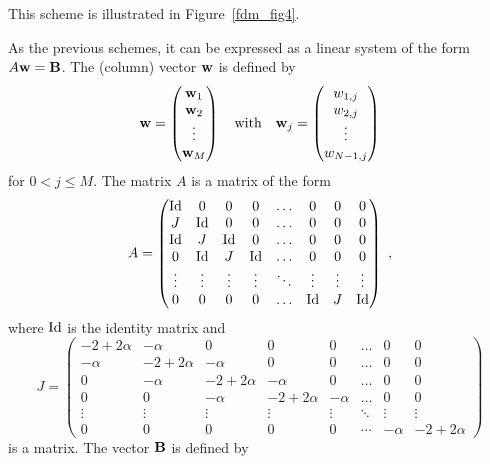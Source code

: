 
This scheme is illustrated in Figure~\ref{fdm_fig4}.

As the previous schemes, it can be expressed as a linear system of the
form $A\mathbf{w} = \mathbf{B}$.  The (column) vector $\mathbf{w}$ is defined by
\[
\mathbf{w} = \begin{pmatrix}
\mathbf{w}_1 \\ \mathbf{w}_2 \\ \vdots \\ \mathbf{w}_M
\end{pmatrix}
\quad \text{with} \quad
\mathbf{w}_j =
\begin{pmatrix} w_{1,j} \\ w_{2,j} \\ \vdots \\ w_{N-1,j} \end{pmatrix}
\]
for $0 < j \leq M$.
The matrix $A$ is a  matrix of the form
\[
A = \begin{pmatrix}
\operatorname{Id} & 0 & 0 & 0 & \ldots & 0 & 0 & 0 \\
J & \operatorname{Id} & 0 & 0 & \ldots & 0 & 0 & 0 \\
\operatorname{Id} & J & \operatorname{Id} & 0 & \ldots & 0 & 0 & 0 \\
0 & \operatorname{Id} & J & \operatorname{Id} & \ldots & 0 & 0 & 0 \\
\vdots & \vdots & \vdots & \vdots & \ddots & \vdots & \vdots & \vdots \\
0 & 0 & 0 & 0 & \ldots & \operatorname{Id} & J & \operatorname{Id}
\end{pmatrix} \ ,
\]
where $\operatorname{Id}$ is the  identity matrix and
\[
J = \begin{pmatrix}
-2+2\alpha & -\alpha & 0 & 0 & 0 & \ldots & 0 & 0 \\
-\alpha & -2+2\alpha & -\alpha & 0 & 0 & \ldots & 0 & 0  \\
0 & -\alpha & -2+2\alpha & -\alpha & 0 & \ldots & 0 & 0 \\
0 & 0 & -\alpha & -2+2\alpha & -\alpha & \ldots & 0 & 0 \\
\vdots & \vdots & \vdots & \vdots & \vdots & \ddots & \vdots & \vdots \\
0 & 0 & 0 & 0 & 0 & \cdots & -\alpha & -2+2\alpha
\end{pmatrix}
\]
is a  matrix.  The vector $\mathbf{B}$ is defined by
